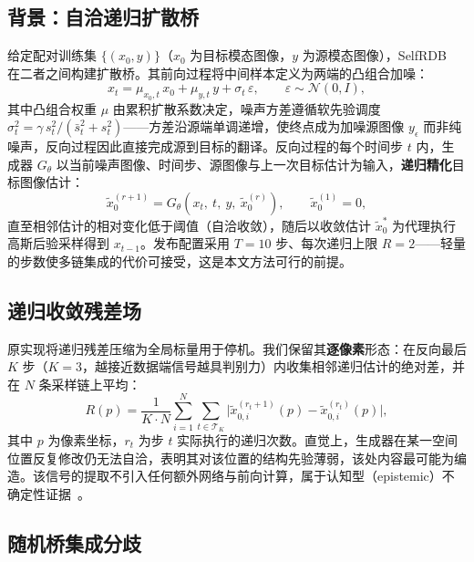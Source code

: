 \documentclass[11pt,a4paper]{ctexart}
\begin{document}
\subsection{背景：自洽递归扩散桥}

给定配对训练集 $\{(x_0, y)\}$（$x_0$ 为目标模态图像，$y$ 为源模态图像），SelfRDB~\cite{arslan2025selfrdb} 在二者之间构建扩散桥。其前向过程将中间样本定义为两端的凸组合加噪：
\begin{equation}
  x_t = \mu_{x_0,t}\, x_0 + \mu_{y,t}\, y + \sigma_t\, \varepsilon,\qquad \varepsilon\sim\mathcal N(0,I),
\end{equation}
其中凸组合权重 $\mu$ 由累积扩散系数决定，噪声方差遵循软先验调度 $\sigma_t^2=\gamma\, s_t^2/(\bar s_t^2+s_t^2)$——方差沿源端单调递增，使终点成为加噪源图像 $y_\epsilon$ 而非纯噪声，反向过程因此直接完成源到目标的翻译。反向过程的每个时间步 $t$ 内，生成器 $G_\theta$ 以当前噪声图像、时间步、源图像与上一次目标估计为输入，\textbf{递归精化}目标图像估计：
\begin{equation}
  \tilde x_0^{(r+1)} = G_\theta(x_t,\ t,\ y,\ \tilde x_0^{(r)}),\qquad \tilde x_0^{(1)} = 0,
\end{equation}
直至相邻估计的相对变化低于阈值（自洽收敛），随后以收敛估计 $\tilde x_0^{*}$ 为代理执行高斯后验采样得到 $x_{t-1}$。发布配置采用 $T{=}10$ 步、每次递归上限 $R{=}2$——轻量的步数使多链集成的代价可接受，这是本文方法可行的前提。

\subsection{递归收敛残差场}

原实现将递归残差压缩为全局标量用于停机。我们保留其\textbf{逐像素}形态：在反向最后 $K$ 步（$K{=}3$，越接近数据端信号越具判别力）内收集相邻递归估计的绝对差，并在 $N$ 条采样链上平均：
\begin{equation}
  R(p) = \frac{1}{K\cdot N}\sum_{i=1}^{N}\sum_{t\in\mathcal T_K}\bigl|\tilde x_{0,i}^{(r_t+1)}(p) - \tilde x_{0,i}^{(r_t)}(p)\bigr|,
  \label{eq:rcrf}
\end{equation}
其中 $p$ 为像素坐标，$r_t$ 为步 $t$ 实际执行的递归次数。直觉上，生成器在某一空间位置反复修改仍无法自洽，表明其对该位置的结构先验薄弱，该处内容最可能为编造。该信号的提取不引入任何额外网络与前向计算，属于认知型（epistemic）不确定性证据~\cite{kendall2017uncertainties}。

\subsection{随机桥集成分歧}
\end{document}
